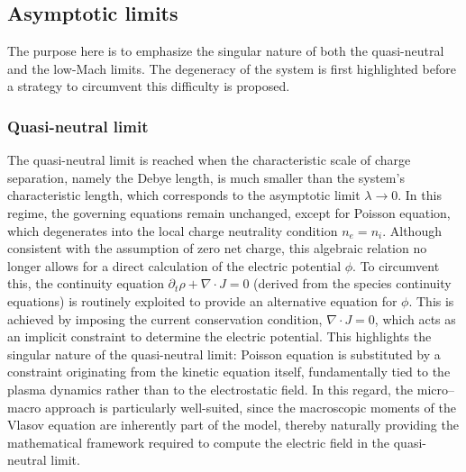 \documentclass[pdflatex,final,10pt]{article}
\newcommand{\Fabrice}[1]{#1}
\begin{document}
\subsection{Asymptotic limits}
The purpose here is to emphasize the singular nature of both the quasi-neutral and the low-Mach limits. The degeneracy of the system is first highlighted before a strategy to circumvent this difficulty is proposed.
\subsubsection{Quasi-neutral limit}
\Fabrice{The quasi-neutral limit is reached when the characteristic scale of charge separation, namely the Debye length, is much smaller than the system's characteristic length, which corresponds to the asymptotic limit $\lambda\to0$. In this regime, the governing equations remain unchanged, except for Poisson equation, which degenerates into the local charge neutrality condition $n_e=n_i$.}
\Fabrice{Although consistent with the assumption of zero net charge, this algebraic relation no longer allows for a direct calculation of the electric potential $\phi$. To circumvent this, the continuity equation $\partial_t \rho + \nabla \cdot J = 0$ (derived from the species continuity equations) is routinely exploited to provide an alternative equation for $\phi$. This is achieved by imposing the current conservation condition, $\nabla \cdot J = 0$, which acts as an implicit constraint to determine the electric potential. This highlights the singular nature of the quasi-neutral limit: Poisson equation is substituted by a constraint originating from the kinetic equation itself, fundamentally tied to the plasma dynamics rather than to the electrostatic field. In this regard, the micro--macro approach is particularly well-suited, since the macroscopic moments of the Vlasov equation are inherently part of the model, thereby naturally providing the mathematical framework required to compute the electric field in the quasi-neutral limit.}
\end{document}
